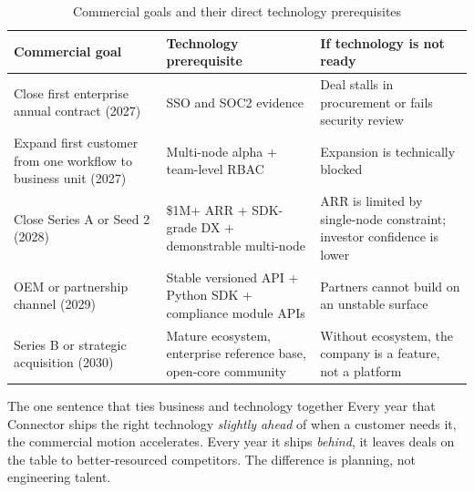 \begin{table}[H]
\centering
\renewcommand{\arraystretch}{1.45}
\begin{tabularx}{\textwidth}{@{}lXX@{}}
\toprule
\textbf{Commercial goal} & \textbf{Technology prerequisite} & \textbf{If technology is not ready} \\
\midrule
Close first enterprise annual contract (2027) & SSO and SOC2 evidence & Deal stalls in procurement or fails security review \\
Expand first customer from one workflow to business unit (2027) & Multi-node alpha + team-level RBAC & Expansion is technically blocked \\
Close Series A or Seed 2 (2028) & \$1M+ ARR + SDK-grade DX + demonstrable multi-node & ARR is limited by single-node constraint; investor confidence is lower \\
OEM or partnership channel (2029) & Stable versioned API + Python SDK + compliance module APIs & Partners cannot build on an unstable surface \\
Series B or strategic acquisition (2030) & Mature ecosystem, enterprise reference base, open-core community & Without ecosystem, the company is a feature, not a platform \\
\bottomrule
\end{tabularx}
\caption{Commercial goals and their direct technology prerequisites}
\end{table}

\begin{insightbox}{The one sentence that ties business and technology together}
Every year that Connector ships the right technology \textit{slightly ahead} of
when a customer needs it, the commercial motion accelerates. Every year it ships
\textit{behind}, it leaves deals on the table to better-resourced competitors.
The difference is planning, not engineering talent.
\end{insightbox}
